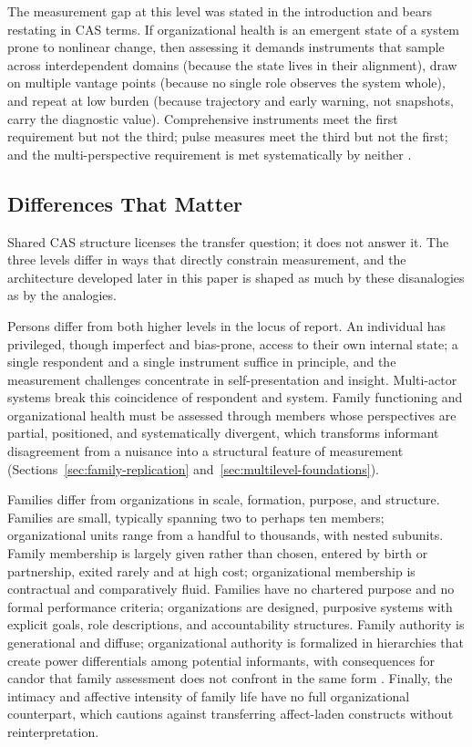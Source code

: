 \documentclass[12pt, letterpaper]{article}
\begin{document}
The measurement gap at this level was stated in the introduction and bears restating in CAS terms. If organizational health is an emergent state of a system prone to nonlinear change, then assessing it demands instruments that sample across interdependent domains (because the state lives in their alignment), draw on multiple vantage points (because no single role observes the system whole), and repeat at low burden (because trajectory and early warning, not snapshots, carry the diagnostic value). Comprehensive instruments meet the first requirement but not the third; pulse measures meet the third but not the first; and the multi-perspective requirement is met systematically by neither \parencite{camp2024,brown2022,elm2012}.

\subsection{Differences That Matter}
\label{sec:differences}

Shared CAS structure licenses the transfer question; it does not answer it. The three levels differ in ways that directly constrain measurement, and the architecture developed later in this paper is shaped as much by these disanalogies as by the analogies.

Persons differ from both higher levels in the locus of report. An individual has privileged, though imperfect and bias-prone, access to their own internal state; a single respondent and a single instrument suffice in principle, and the measurement challenges concentrate in self-presentation and insight. Multi-actor systems break this coincidence of respondent and system. Family functioning and organizational health must be assessed through members whose perspectives are partial, positioned, and systematically divergent, which transforms informant disagreement from a nuisance into a structural feature of measurement (Sections~\ref{sec:family-replication} and~\ref{sec:multilevel-foundations}).

Families differ from organizations in scale, formation, purpose, and structure. Families are small, typically spanning two to perhaps ten members; organizational units range from a handful to thousands, with nested subunits. Family membership is largely given rather than chosen, entered by birth or partnership, exited rarely and at high cost; organizational membership is contractual and comparatively fluid. Families have no chartered purpose and no formal performance criteria; organizations are designed, purposive systems with explicit goals, role descriptions, and accountability structures. Family authority is generational and diffuse; organizational authority is formalized in hierarchies that create power differentials among potential informants, with consequences for candor that family assessment does not confront in the same form \parencite{edmondson1999}. Finally, the intimacy and affective intensity of family life have no full organizational counterpart, which cautions against transferring affect-laden constructs without reinterpretation.
\end{document}
